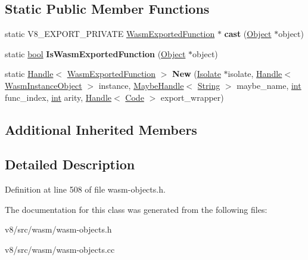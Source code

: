 \subsection*{Static Public Member Functions}
\begin{DoxyCompactItemize}
\item 
\mbox{\label{classv8_1_1internal_1_1WasmExportedFunction_aed05309f581450ebbe480fab726d938f}} 
static V8\+\_\+\+E\+X\+P\+O\+R\+T\+\_\+\+P\+R\+I\+V\+A\+TE \mbox{\hyperlink{classv8_1_1internal_1_1WasmExportedFunction}{Wasm\+Exported\+Function}} $\ast$ {\bfseries cast} (\mbox{\hyperlink{classv8_1_1internal_1_1Object}{Object}} $\ast$object)
\item 
\mbox{\label{classv8_1_1internal_1_1WasmExportedFunction_a00c8bf950c89339a7146440394474a19}} 
static \mbox{\hyperlink{classbool}{bool}} {\bfseries Is\+Wasm\+Exported\+Function} (\mbox{\hyperlink{classv8_1_1internal_1_1Object}{Object}} $\ast$object)
\item 
\mbox{\label{classv8_1_1internal_1_1WasmExportedFunction_af9b28f3c20a7a7d6c6331bf21351035d}} 
static \mbox{\hyperlink{classv8_1_1internal_1_1Handle}{Handle}}$<$ \mbox{\hyperlink{classv8_1_1internal_1_1WasmExportedFunction}{Wasm\+Exported\+Function}} $>$ {\bfseries New} (\mbox{\hyperlink{classv8_1_1internal_1_1Isolate}{Isolate}} $\ast$isolate, \mbox{\hyperlink{classv8_1_1internal_1_1Handle}{Handle}}$<$ \mbox{\hyperlink{classv8_1_1internal_1_1WasmInstanceObject}{Wasm\+Instance\+Object}} $>$ instance, \mbox{\hyperlink{classv8_1_1internal_1_1MaybeHandle}{Maybe\+Handle}}$<$ \mbox{\hyperlink{classv8_1_1internal_1_1String}{String}} $>$ maybe\+\_\+name, \mbox{\hyperlink{classint}{int}} func\+\_\+index, \mbox{\hyperlink{classint}{int}} arity, \mbox{\hyperlink{classv8_1_1internal_1_1Handle}{Handle}}$<$ \mbox{\hyperlink{classv8_1_1internal_1_1Code}{Code}} $>$ export\+\_\+wrapper)
\end{DoxyCompactItemize}
\subsection*{Additional Inherited Members}


\subsection{Detailed Description}


Definition at line 508 of file wasm-\/objects.\+h.



The documentation for this class was generated from the following files\+:\begin{DoxyCompactItemize}
\item 
v8/src/wasm/wasm-\/objects.\+h\item 
v8/src/wasm/wasm-\/objects.\+cc\end{DoxyCompactItemize}
